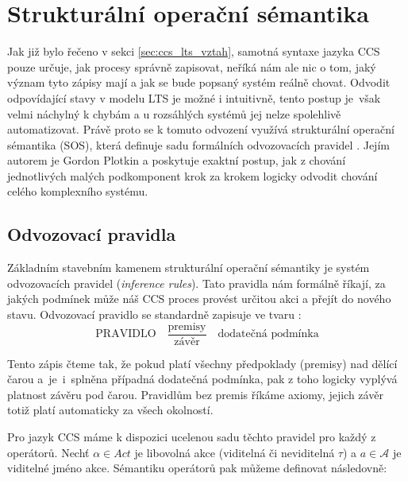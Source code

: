 \section{Strukturální operační sémantika}
\label{sec:sos}
Jak již bylo řečeno v sekci \ref{sec:ccs_lts_vztah}, samotná syntaxe jazyka CCS pouze určuje, jak procesy správně zapisovat, neříká nám ale nic o tom, jaký význam tyto zápisy mají a jak se bude popsaný systém reálně chovat.
Odvodit odpovídající stavy v modelu LTS je možné i intuitivně, tento postup je~však velmi náchylný k chybám a u rozsáhlých systémů jej nelze spolehlivě automatizovat. Právě proto se k tomuto odvození využívá strukturální operační sémantika (SOS), která definuje sadu formálních odvozovacích pravidel \cite{aceto2007reactive}.
Jejím autorem je Gordon Plotkin a poskytuje exaktní postup, jak z chování jednotlivých malých podkomponent krok za krokem logicky odvodit chování celého komplexního systému.

\subsection{Odvozovací pravidla}
Základním stavebním kamenem strukturální operační sémantiky je systém odvozovacích pravidel (\textit{inference rules}). 
Tato pravidla nám formálně říkají, za jakých podmínek může náš CCS proces provést určitou akci a přejít do nového stavu. 
Odvozovací pravidlo se standardně zapisuje ve tvaru \cite{presentation1}:
\[ \text{PRAVIDLO} \quad \frac{\text{premisy}}{\text{závěr}} \quad \text{dodatečná podmínka} \]

Tento zápis čteme tak, že pokud platí všechny předpoklady (premisy) nad dělící čarou a~je~i~splněna případná dodatečná podmínka, pak z toho logicky vyplývá platnost závěru pod čarou. 
Pravidlům bez premis říkáme axiomy, jejich závěr totiž platí automaticky za všech okolností.

Pro jazyk CCS máme k dispozici ucelenou sadu těchto pravidel pro každý z operátorů. 
Nechť $\alpha \in Act$ je libovolná akce (viditelná či neviditelná $\tau$) a $a \in \mathcal{A}$ je viditelné jméno akce. Sémantiku operátorů pak můžeme definovat následovně:

